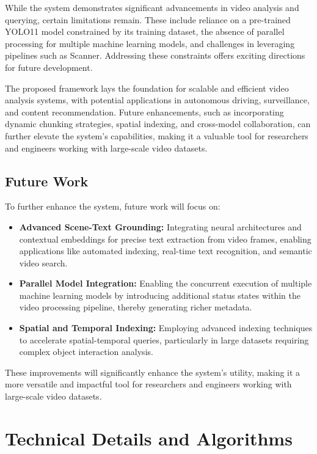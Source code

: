 \documentclass[conference]{IEEEtran}
\begin{document}
While the system demonstrates significant advancements in video analysis and querying, certain limitations remain. These include reliance on a pre-trained YOLO11 model constrained by its training dataset, the absence of parallel processing for multiple machine learning models, and challenges in leveraging pipelines such as Scanner. Addressing these constraints offers exciting directions for future development.

The proposed framework lays the foundation for scalable and efficient video analysis systems, with potential applications in autonomous driving, surveillance, and content recommendation. Future enhancements, such as incorporating dynamic chunking strategies, spatial indexing, and cross-model collaboration, can further elevate the system's capabilities, making it a valuable tool for researchers and engineers working with large-scale video datasets.

\label{sec:future-work-sub}
\subsection{Future Work}
To further enhance the system, future work will focus on:
\begin{itemize}
    \item \textbf{Advanced Scene-Text Grounding:} Integrating neural architectures and contextual embeddings for precise text extraction from video frames, enabling applications like automated indexing, real-time text recognition, and semantic video search.
    \item \textbf{Parallel Model Integration:} Enabling the concurrent execution of multiple machine learning models by introducing additional status states within the video processing pipeline, thereby generating richer metadata.
    \item \textbf{Spatial and Temporal Indexing:} Employing advanced indexing techniques to accelerate spatial-temporal queries, particularly in large datasets requiring complex object interaction analysis.
\end{itemize}

These improvements will significantly enhance the system's utility, making it a more versatile and impactful tool for researchers and engineers working with large-scale video datasets.


\section{Technical Details and Algorithms}
\end{document}
